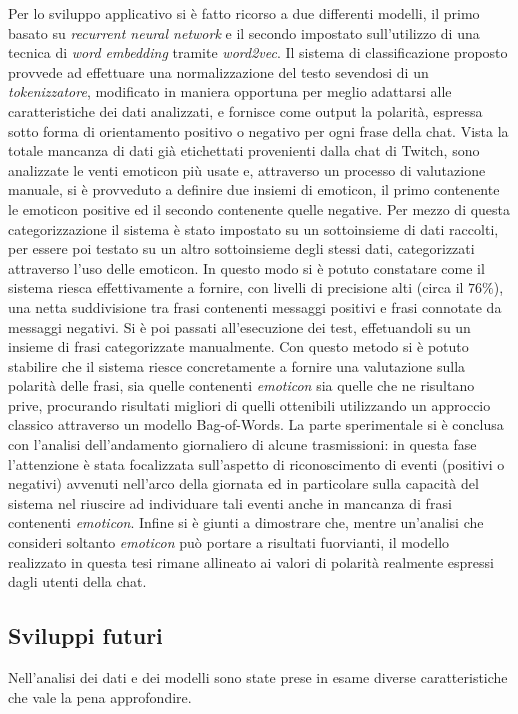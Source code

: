 \documentclass[a4paper,12pt,openright,twoside]{report}
\theoremstyle{definition}
\begin{document}
Per lo sviluppo applicativo si è fatto ricorso a due differenti modelli, il primo basato su 
\emph{recurrent neural network} e il secondo 
impostato sull'utilizzo di una tecnica di \emph{word embedding}
tramite \emph{word2vec}.
Il sistema di classificazione proposto provvede ad effettuare una normalizzazione del testo 
sevendosi di 
un \emph{tokenizzatore}, modificato in maniera opportuna per meglio 
adattarsi alle caratteristiche
dei dati analizzati, e fornisce come output la polarità, espressa sotto forma di orientamento
positivo o negativo per ogni frase della chat.
Vista la totale mancanza di dati già etichettati provenienti dalla chat di Twitch,
sono analizzate le venti emoticon più usate e, attraverso un processo di valutazione
manuale, si è provveduto a definire due insiemi di emoticon,
il primo contenente le emoticon positive
ed il secondo contenente quelle negative.
Per mezzo di questa categorizzazione il sistema è stato impostato su un sottoinsieme di dati
raccolti, per essere poi testato su un altro sottoinsieme degli stessi dati, 
categorizzati attraverso l'uso
delle emoticon. In questo modo si è potuto constatare come il sistema riesca
effettivamente a 
fornire, con livelli di precisione alti (circa il $76\%$), una netta
suddivisione tra frasi contenenti messaggi positivi e frasi connotate da
messaggi negativi. 
Si è poi passati all'esecuzione dei test,
effetuandoli su un insieme di frasi categorizzate manualmente.
Con questo metodo si è potuto stabilire che il sistema riesce concretamente a 
fornire una valutazione sulla polarità delle frasi, sia 
quelle contenenti \emph{emoticon} sia quelle che ne risultano prive,
procurando risultati migliori di quelli ottenibili utilizzando un approccio classico attraverso un modello
Bag-of-Words.
La parte sperimentale si è conclusa con l'analisi dell'andamento giornaliero di alcune
trasmissioni: in questa fase l'attenzione è stata focalizzata sull'aspetto di riconoscimento 
di eventi (positivi o negativi)
avvenuti nell'arco della giornata ed in particolare sulla capacità
del sistema nel riuscire ad individuare tali eventi anche in mancanza di frasi contenenti 
\emph{emoticon}. Infine si è giunti a dimostrare che, 
mentre un'analisi che consideri soltanto \emph{emoticon} può portare a risultati fuorvianti, 
il modello realizzato in questa tesi rimane allineato ai valori di polarità 
realmente espressi dagli utenti della chat.

\subsection{Sviluppi futuri}
Nell'analisi dei dati e dei modelli sono state prese in esame diverse caratteristiche che vale
la pena approfondire.
\end{document}
